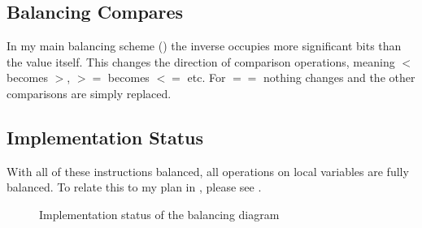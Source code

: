 \subsection{Balancing Compares}
In my main balancing scheme () the inverse occupies more significant bits than the value itself.
This changes the direction of comparison operations, meaning $<$ becomes $>$, $>=$ becomes $<=$ etc.
For $==$ nothing changes and the other comparisons are simply replaced.

\subsection{Implementation Status}
With all of these instructions balanced, all operations on local variables are fully balanced.
To relate this to my plan in , please see .

\begin{figure}[h]
  \centering
  \caption{Implementation status of the balancing diagram}
  \label{fig:diagram-implemented}
\end{figure}
